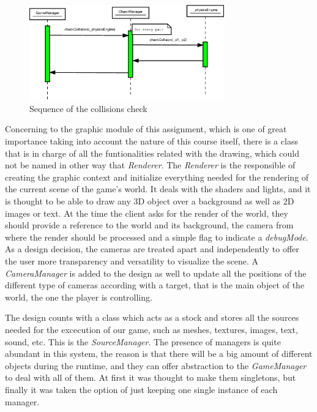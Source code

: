 \documentclass[]{article}
\begin{document}
\begin{figure}[h]
\begin{center}
\includegraphics[width=0.75\textwidth]{images/physicsEngineSec.eps}
\caption{Sequence of the collisions check}
\label{fig:pesec}
\end{center}
\end{figure}

Concerning to the graphic module of this assignment, which is one of great importance taking into account the nature of this course itself, there is a class that is in charge of all the funtionalities
related with the drawing, which could not be named in other way that \emph{Renderer}. The \emph{Renderer} is the responsible of creating the graphic context and initialize everything needed for the
rendering of the current scene of the game's world. It deals with the shaders and lights, and it is thought to be able to draw any 3D object over a background as well as 2D images or text. At the time 
the client asks for the render of the world, they should provide a reference to the world and its background, the camera from where the render should be processed and a simple flag to indicate a \emph{debugMode}.
As a design decision, the cameras are treated apart and independently to offer the user more transparency and versatility to visualize the scene. A \emph{CameraManager} is added to the design as well to
update all the positions of the different type of cameras according with a target, that is the main object of the world, the one the player is controlling.

The design counts with a class which acts as a stock and stores all the sources needed for the excecution of our game, such as meshes, textures, images, text, sound, etc. This is the 
\emph{SourceManager}. The presence of managers is quite abundant in this system, the reason is that there will be a big amount of different objects during the runtime, and they can offer abstraction
to the \emph{GameManager} to deal with all of them. At first it was thought to make them singletons, but finally it was taken the option of just keeping one single instance of each manager.
\end{document}
